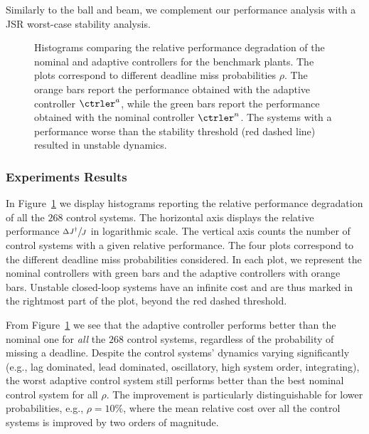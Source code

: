 Similarly to the ball and beam, we complement our performance analysis with a JSR worst-case stability analysis.

\begin{figure}
    \centering
    
    \caption{Histograms comparing the relative performance degradation of the nominal and adaptive controllers for the benchmark plants.
    The plots correspond to different deadline miss probabilities $\rho$.
    The orange bars report the performance obtained with the adaptive controller $\ctrler^a$, while the green bars report the performance obtained with the nominal controller $\ctrler^n$.
    The systems with a performance worse than the stability threshold (red dashed line) resulted in unstable dynamics.}
    \label{fig:aggregate}
\end{figure}

\subsubsection*{Experiments Results}
In Figure~\ref{fig:aggregate} we display histograms reporting the relative performance degradation of all the $268$ control systems.
The horizontal axis displays the relative performance $\sfrac{\Delta J^\dagger}{J}$ in logarithmic scale. 
The vertical axis counts the number of control systems with a given relative performance.
The four plots correspond to the different deadline miss probabilities considered.
In each plot, we represent the nominal controllers with green bars and the adaptive controllers with orange bars.
Unstable closed-loop systems have an infinite cost and are thus marked in the rightmost part of the plot, beyond the red dashed threshold.

From Figure~\ref{fig:aggregate} we see that the adaptive controller performs better than the nominal one for \emph{all} the $268$ control systems, regardless of the probability of missing a deadline.
Despite the control systems' dynamics varying significantly (e.g., lag dominated, lead dominated, oscillatory, high system order, integrating), the worst adaptive control system still performs better than the best nominal control system for all $\rho$.
The improvement is particularly distinguishable for lower probabilities, e.g., $\rho=10\%$, where the mean relative cost over all the control systems is improved by two orders of magnitude.

